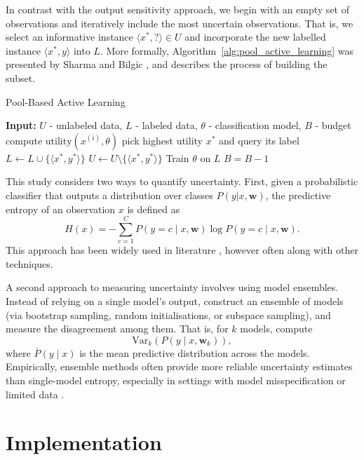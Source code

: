 \documentclass[10pt, conference]{IEEEtran}
\begin{document}
In contrast with the output sensitivity approach, we begin with an empty set of observations and iteratively include the most uncertain observations. That is, we select an informative instance $\langle x^{*}, ? \rangle \in U$ and incorporate the new labelled instance $\langle x^{*}, y \rangle$ into $L$. More formally, Algorithm~\ref{alg:pool_active_learning} was presented by Sharma and Bilgic \cite{alus}, and describes the process of building the subset.


\begin{algorithm}
	\caption{Pool-Based Active Learning}
	\label{alg:pool_active_learning}
	\begin{algorithmic}[1]
		\State \textbf{Input:} $U$ - unlabeled data, $L$ - labeled data, $\theta$ - classification model, $B$ - budget
		\Repeat
		\State compute $\text{utility}(x^{(i)}, \theta)$
		\EndFor
		\State pick highest utility $x^*$ and query its label
		\State $L \leftarrow L \cup \{\langle x^*, y^* \rangle\}$
		\State $U \leftarrow U \setminus \{\langle x^*, y^* \rangle\}$
		\State Train $\theta$ on $L$
		\State $B = B - 1$
	\end{algorithmic}
\end{algorithm}

This study considers two ways to quantify uncertainty. First, given a probabilistic classifier that outputs a distribution over classes $P(y|x, \mathbf{w})$, the predictive entropy of an observation $x$ is defined as
\[
H(x) = - \sum_{c=1}^{C} P(y=c \mid x, \mathbf{w}) \log P(y=c \mid x, \mathbf{w}).
\]
This approach has been widely used in literature \cite{e1, e2, e3}, however often along with other techniques.

A second approach to measuring uncertainty involves using model ensembles. Instead of relying on a single model's output, construct an ensemble of models (via bootstrap sampling, random initialisations, or subspace sampling), and measure the disagreement among them. That is, for $k$ models, compute
\[
\mathrm{Var}_{k}(P(y \mid x, \mathbf{w}_k)),
\]
where $\bar P(y \mid x)$ is the mean predictive distribution across the models. Empirically, ensemble methods often provide more reliable uncertainty estimates than single-model entropy, especially in settings with model misspecification or limited data \cite{Yin2023_uncertainty_active_learning}.

\section{Implementation}
\end{document}
